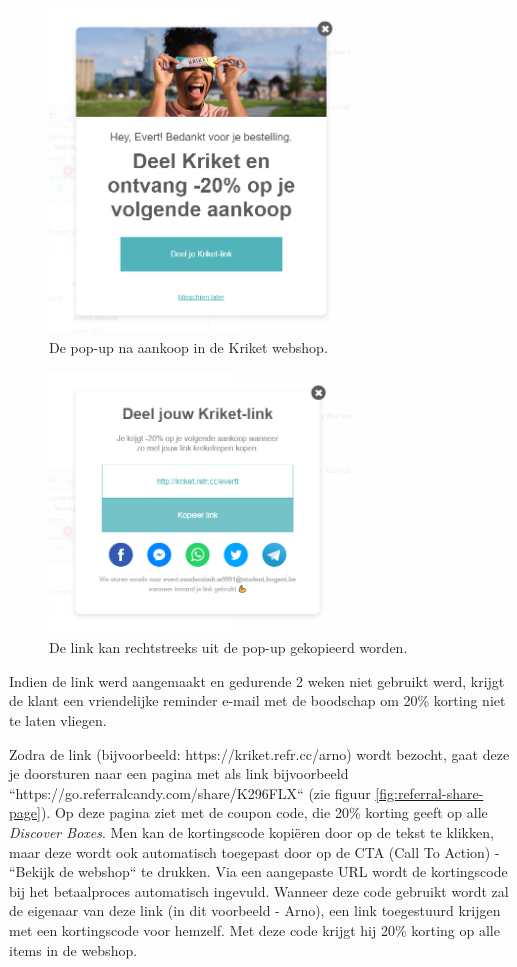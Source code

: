 \begin{figure}[h!]
	\includegraphics[width=80mm,scale=0.7]{img/referral-pop-up-1.png}
	\centering
	\caption{De pop-up na aankoop in de Kriket webshop.}
	\label{fig:referral-popup-webshop-1}
\end{figure}
\begin{figure}[h!]
\includegraphics[width=80mm,scale=0.7]{img/referral-pop-up-2.png}
\centering
\caption{De link kan rechtstreeks uit de pop-up gekopieerd worden.}
\label{fig:referral-popup-webshop-2}
\end{figure}

Indien de link werd aangemaakt en gedurende 2 weken niet gebruikt werd, krijgt de klant een vriendelijke reminder e-mail met de boodschap om 20\% korting niet te laten vliegen.

Zodra de link (bijvoorbeeld: https://kriket.refr.cc/arno) wordt bezocht, gaat deze je doorsturen naar een pagina met als link bijvoorbeeld ``https://go.referralcandy.com/share/K296FLX`` (zie figuur \ref{fig:referral-share-page}). Op deze pagina ziet met de coupon code, die 20\% korting geeft op alle \emph{Discover Boxes}. Men kan de kortingscode kopiëren door op de tekst te klikken, maar deze wordt ook automatisch toegepast door op de CTA (Call To Action) - ``Bekijk de webshop`` te drukken. Via een aangepaste URL wordt de kortingscode bij het betaalproces automatisch ingevuld. Wanneer deze code gebruikt wordt zal de eigenaar van deze link (in dit voorbeeld - Arno), een link toegestuurd krijgen met een kortingscode voor hemzelf. Met deze code krijgt hij 20\% korting op alle items in de webshop.

